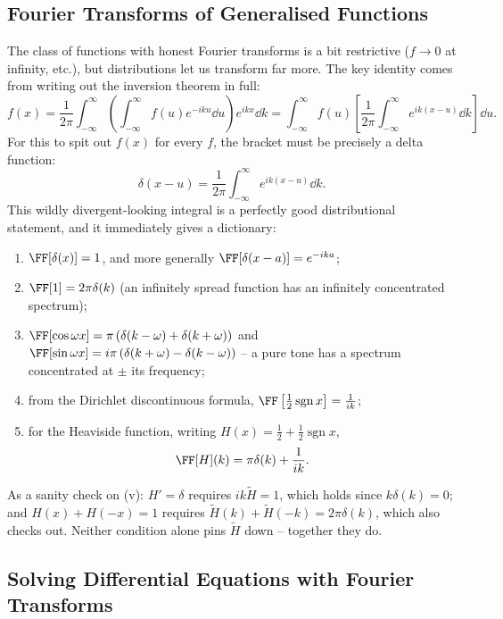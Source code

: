 \documentclass[a4paper]{scrartcl}
\newcommand{\sgn}{\operatorname{sgn}}
\begin{document}
\subsection{Fourier Transforms of Generalised Functions}

The class of functions with honest Fourier transforms is a bit restrictive ($f \to 0$ at infinity, etc.), but distributions let us transform far more. The key identity comes from writing out the inversion theorem in full:
$$
f(x) = \frac{1}{2\pi} \int_{-\infty}^{\infty} \left(\int_{-\infty}^{\infty} f(u) e^{-iku} \dd u \right) e^{ikx} \dd k = \int_{-\infty}^{\infty} f(u) \left[\frac{1}{2\pi} \int_{-\infty}^{\infty} e^{ik(x - u)} \dd k\right] \dd u.
$$
For this to spit out $f(x)$ for every $f$, the bracket must be precisely a delta function:
$$
\delta(x - u) = \frac{1}{2\pi}\int_{-\infty}^{\infty} e^{ik(x - u)} \dd k.
$$
This wildly divergent-looking integral is a perfectly good distributional statement, and it immediately gives a dictionary:
\begin{enumerate}[label=(\roman*)]
    \item $\FF[\delta(x)] = 1$, and more generally $\FF[\delta(x - a)] = e^{-ika}$;
    \item $\FF[1] = 2 \pi \delta(k)$ (an infinitely spread function has an infinitely concentrated spectrum);
    \item $\FF[\cos \omega x] = \pi \left(\delta(k - \omega) + \delta(k + \omega)\right)$ and $\FF[\sin \omega x] = i\pi\left(\delta(k + \omega) - \delta(k - \omega)\right)$ -- a pure tone has a spectrum concentrated at $\pm$ its frequency;
    \item from the Dirichlet discontinuous formula, $\FF\left[\frac{1}{2}\sgn x \right] = \frac{1}{ik}$;
    \item for the Heaviside function, writing $H(x) = \frac{1}{2} + \frac{1}{2}\sgn x$,
    $$
    \FF[H](k) = \pi \delta(k) + \frac{1}{ik}.
    $$
\end{enumerate}
As a sanity check on (v): $H' = \delta$ requires $ik \tilde{H} = 1$, which holds since $k \delta(k) = 0$; and $H(x) + H(-x) = 1$ requires $\tilde H(k) + \tilde H(-k) = 2\pi \delta(k)$, which also checks out. Neither condition alone pins $\tilde H$ down -- together they do.

\subsection{Solving Differential Equations with Fourier Transforms}
\end{document}
